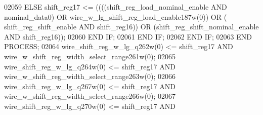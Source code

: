 \begin{DoxyCode}
{02059                 \textcolor{keywordflow}{ELSE} \textcolor{vhdlchar}{shift_reg17} \textcolor{vhdlchar}{<=} \textcolor{vhdlchar}{(}\textcolor{vhdlchar}{(}\textcolor{vhdlchar}{(}\textcolor{vhdlchar}{(}\textcolor{vhdlchar}{shift_reg_load_nominal_enable} \textcolor{keywordflow}{AND} \textcolor{vhdlchar}{
      nominal_data0}\textcolor{vhdlchar}{)} \textcolor{keywordflow}{OR} \textcolor{vhdlchar}{wire_w_lg_shift_reg_load_enable187w}\textcolor{vhdlchar}{(}\textcolor{vhdllogic}{}\textcolor{vhdllogic}{0}\textcolor{vhdlchar}{)}\textcolor{vhdlchar}{)} \textcolor{keywordflow}{OR} \textcolor{vhdlchar}{(}\textcolor{vhdlchar}{
      shift_reg_shift_enable} \textcolor{keywordflow}{AND} \textcolor{vhdlchar}{shift_reg16}\textcolor{vhdlchar}{)}\textcolor{vhdlchar}{)} \textcolor{keywordflow}{OR} \textcolor{vhdlchar}{(}\textcolor{vhdlchar}{shift_reg_shift_nominal_enable} \textcolor{keywordflow}{AND} \textcolor{vhdlchar}{
      shift_reg16}\textcolor{vhdlchar}{)}\textcolor{vhdlchar}{)};
02060                 \textcolor{keywordflow}{END} \textcolor{keywordflow}{IF};
02061             \textcolor{keywordflow}{END} \textcolor{keywordflow}{IF};
02062         \textcolor{keywordflow}{END} \textcolor{keywordflow}{IF};
02063     \textcolor{keywordflow}{END} \textcolor{keywordflow}{PROCESS};
02064     \textcolor{vhdlchar}{wire_shift_reg_w_lg_q262w}\textcolor{vhdlchar}{(}\textcolor{vhdllogic}{}\textcolor{vhdllogic}{0}\textcolor{vhdlchar}{)} \textcolor{vhdlchar}{<=} \textcolor{vhdlchar}{shift_reg17} \textcolor{keywordflow}{AND} \textcolor{vhdlchar}{
      wire_w_shift_reg_width_select_range261w}\textcolor{vhdlchar}{(}\textcolor{vhdllogic}{}\textcolor{vhdllogic}{0}\textcolor{vhdlchar}{)};
02065     \textcolor{vhdlchar}{wire_shift_reg_w_lg_q264w}\textcolor{vhdlchar}{(}\textcolor{vhdllogic}{}\textcolor{vhdllogic}{0}\textcolor{vhdlchar}{)} \textcolor{vhdlchar}{<=} \textcolor{vhdlchar}{shift_reg17} \textcolor{keywordflow}{AND} \textcolor{vhdlchar}{
      wire_w_shift_reg_width_select_range263w}\textcolor{vhdlchar}{(}\textcolor{vhdllogic}{}\textcolor{vhdllogic}{0}\textcolor{vhdlchar}{)};
02066     \textcolor{vhdlchar}{wire_shift_reg_w_lg_q267w}\textcolor{vhdlchar}{(}\textcolor{vhdllogic}{}\textcolor{vhdllogic}{0}\textcolor{vhdlchar}{)} \textcolor{vhdlchar}{<=} \textcolor{vhdlchar}{shift_reg17} \textcolor{keywordflow}{AND} \textcolor{vhdlchar}{
      wire_w_shift_reg_width_select_range266w}\textcolor{vhdlchar}{(}\textcolor{vhdllogic}{}\textcolor{vhdllogic}{0}\textcolor{vhdlchar}{)};
02067     \textcolor{vhdlchar}{wire_shift_reg_w_lg_q270w}\textcolor{vhdlchar}{(}\textcolor{vhdllogic}{}\textcolor{vhdllogic}{0}\textcolor{vhdlchar}{)} \textcolor{vhdlchar}{<=} \textcolor{vhdlchar}{shift_reg17} \textcolor{keywordflow}{AND} \textcolor{vhdlchar}{
}}
\end{DoxyCode}
